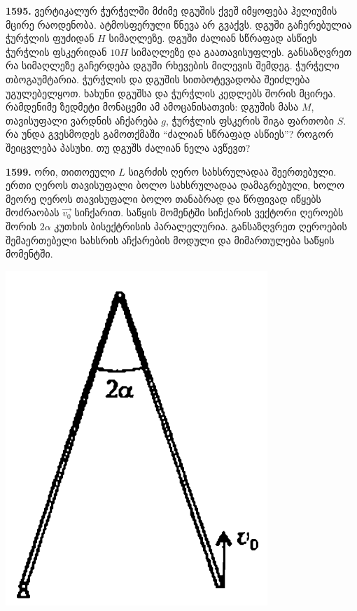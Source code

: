 \documentclass[12pt,a4paper,]{report}
\begin{document}
\textbf{1595.} ვერტიკალურ ჭურჭელში მძიმე დგუშის ქვეშ იმყოფება ჰელიუმის მცირე რაოდენობა. ატმოსფერული წნევა არ გვაქვს. დგუში გაჩერებულია ჭურჭლის ფუძიდან $H$ სიმაღლეზე. დგუში ძალიან სწრაფად ასწიეს ჭურჭლის ფსკერიდან $10H$ სიმაღლეზე და გაათავისუფლეს. განსაზღვრეთ რა სიმაღლეზე გაჩერდება დგუში რხევების მილევის შემდეგ. ჭურჭელი თბოგაუმტარია. ჭურჭლის და დგუშის სითბოტევადობა შეიძლება უგულებელყოთ. ხახუნი დგუშსა და ჭურჭლის კედლებს შორის მცირეა. რამდენიმე ზედმეტი მონაცემი ამ ამოცანისათვის: დგუშის მასა $M$, თავისუფალი ვარდნის აჩქარება $g$, ჭურჭლის ფსკერის შიგა ფართობი $S$. რა უნდა გვესმოდეს გამოთქმაში “ძალიან სწრაფად ასწიეს”? როგორ შეიცვლება პასუხი. თუ დგუშს ძალიან ნელა ავწევთ?

\textbf{1599.} ორი, თითოეული $L$ სიგრძის ღერო სახსრულადაა შეერთებული. ერთი ღეროს თავისუფალი ბოლო სახსრულადაა დამაგრებული, ხოლო მეორე ღეროს თავისუფალი ბოლო თანაბრად და წრფივად იწყებს მოძრაობას $\vec{v_0}$ სიჩქარით. საწყის მომენტში სიჩქარის ვექტორი ღეროებს შორის $2\alpha$ კუთხის ბისექტრისის პარალელურია. განსაზღვრეთ ღეროების შემაერთებელი სახსრის აჩქარების მოდული და მიმართულება საწყის მომენტში. 
		\begin{center}
			\includegraphics[scale=0.4]{images/F1599.png}
		\end{center}
	
\end{document}
